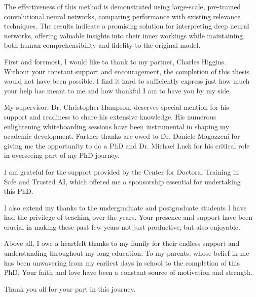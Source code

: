 \documentclass[12pt]{muthesis}
\theoremstyle{definition}
\begin{document}
\noindent
The effectiveness of this method is demonstrated using large-scale, pre-trained convolutional neural networks, comparing performance with existing relevance techniques. The results indicate a promising solution for interpreting deep neural networks, offering valuable insights into their inner workings while maintaining both human comprehensibility and fidelity to the original model.


First and foremost, I would like to thank to my partner, Charles Higgins. Without your constant support and encouragement, the completion of this thesis would not have been possible. I find it hard to sufficiently express just how much your help has meant to me and how thankful I am to have you by my side.

\noindent
My supervisor, Dr. Christopher Hampson, deserves special mention for his support and readiness to share his extensive knowledge. His numerous enlightening whiteboarding sessions have been instrumental in shaping my academic development. Further thanks are owed to Dr. Daniele Magazzeni for giving me the opportunity to do a PhD and Dr. Michael Luck for his critical role in overseeing part of my PhD journey.

\noindent
I am grateful for the support provided by the Center for Doctoral Training in Safe and Trusted AI, which offered me a sponsorship essential for undertaking this PhD.

\noindent
I also extend my thanks to the undergraduate and postgraduate students I have had the privilege of teaching over the years. Your presence and support have been crucial in making these past few years not just productive, but also enjoyable. 

\noindent
Above all, I owe a heartfelt thanks to my family for their endless support and understanding throughout my long education. To my parents, whose belief in me has been unwavering from my earliest days in school to the completion of this PhD. Your faith and love have been a constant source of motivation and strength.

\noindent
Thank you all for your part in this journey.
\contentspage


\end{document}
